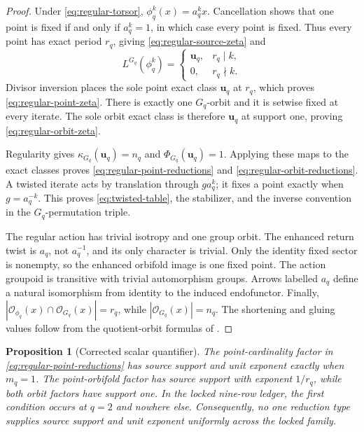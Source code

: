 \documentclass[11pt]{article}
\newtheorem{proposition}[theorem]{Proposition}
\theoremstyle{definition}
\theoremstyle{remark}
\begin{document}
\begin{proof}
Under \eqref{eq:regular-torsor},
\(\phi_q^k(x)=a_q^kx\).  Cancellation shows that one point is fixed if and
only if \(a_q^k=1\), in which case every point is fixed.  Thus every point
has exact period \(r_q\), giving \eqref{eq:regular-source-zeta} and
\begin{equation}
  L^{G_q}(\phi_q^k)
  =
  \begin{cases}
    \mathbf u_q,&r_q\mid k,\\
    0,&r_q\nmid k.
  \end{cases}
  \label{eq:regular-point-lefschetz}
\end{equation}
Divisor inversion places the sole point exact class \(\mathbf u_q\) at
\(r_q\), which proves \eqref{eq:regular-point-zeta}.  There is exactly one
\(G_q\)-orbit and it is setwise fixed at every iterate.  The sole orbit
exact class is therefore \(\mathbf u_q\) at support one, proving
\eqref{eq:regular-orbit-zeta}.

Regularity gives
\(\kappa_{G_q}(\mathbf u_q)=n_q\) and
\(\Phi_{G_q}(\mathbf u_q)=1\).  Applying these maps to the exact classes
proves \eqref{eq:regular-point-reductions} and
\eqref{eq:regular-orbit-reductions}.  A twisted iterate acts by translation
through \(ga_q^k\); it fixes a point exactly when \(g=a_q^{-k}\).  This
proves \eqref{eq:twisted-table}, the stabilizer, and the inverse convention
in the \(G_q\)-permutation triple.

The regular action has trivial isotropy and one group orbit.  The enhanced
return twist is \(a_q\), not \(a_q^{-1}\), and its only character is trivial.
Only the identity fixed sector is nonempty, so the enhanced orbifold image
is one fixed point.  The action groupoid is transitive with trivial
automorphism groups.  Arrows labelled \(a_q\) define a natural isomorphism
from identity to the induced endofunctor.  Finally,
\(|\mathcal O_{\phi_q}(x)\cap\mathcal O_{G_q}(x)|=r_q\), while
\(|\mathcal O_{G_q}(x)|=n_q\).  The shortening and gluing values follow from
the quotient-orbit formulas of \citet{Zegowitz2017}.
\end{proof}

\begin{proposition}[Corrected scalar quantifier]
\label{prop:corrected-tradeoff}
The point-cardinality factor in
\eqref{eq:regular-point-reductions} has source support and unit exponent
exactly when \(m_q=1\).  The point-orbifold factor has source support with
exponent \(1/r_q\), while both orbit factors have support one.  In the locked
nine-row ledger, the first condition occurs at \(q=2\) and nowhere else.
Consequently, no one reduction type supplies source support and unit exponent
uniformly across the locked family.
\end{proposition}
\end{document}
